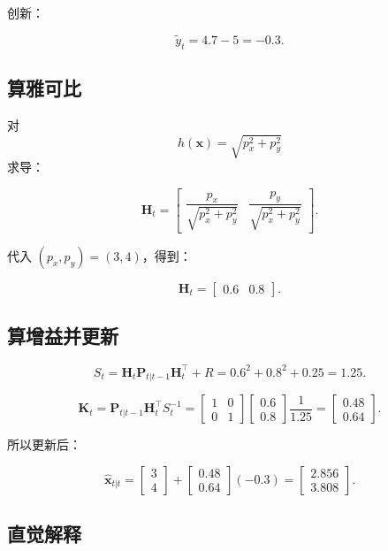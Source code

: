 \documentclass[12pt,a4paper]{ctexart}
\begin{document}
创新：

\[
\tilde{y}_t = 4.7 - 5 = -0.3.
\]

\subsection{算雅可比}

对
\[
h(\bm{x}) = \sqrt{p_x^2 + p_y^2}
\]
求导：

\[
\bm{H}_t
=
\begin{bmatrix}
\dfrac{p_x}{\sqrt{p_x^2 + p_y^2}} &
\dfrac{p_y}{\sqrt{p_x^2 + p_y^2}}
\end{bmatrix}.
\]

代入 \((p_x, p_y)=(3,4)\)，得到：

\[
\bm{H}_t =
\begin{bmatrix}
0.6 & 0.8
\end{bmatrix}.
\]

\subsection{算增益并更新}

\[
S_t = \bm{H}_t\bm{P}_{t|t-1}\bm{H}_t^\top + R
= 0.6^2 + 0.8^2 + 0.25
= 1.25.
\]

\[
\bm{K}_t
= \bm{P}_{t|t-1}\bm{H}_t^\top S_t^{-1}
=
\begin{bmatrix}
1 & 0\\
0 & 1
\end{bmatrix}
\begin{bmatrix}
0.6\\
0.8
\end{bmatrix}
\frac{1}{1.25}
=
\begin{bmatrix}
0.48\\
0.64
\end{bmatrix}.
\]

所以更新后：

\[
\hat{\bm{x}}_{t|t}
=
\begin{bmatrix}
3\\
4
\end{bmatrix}
+
\begin{bmatrix}
0.48\\
0.64
\end{bmatrix}
(-0.3)
=
\begin{bmatrix}
2.856\\
3.808
\end{bmatrix}.
\]

\subsection{直觉解释}
\end{document}
